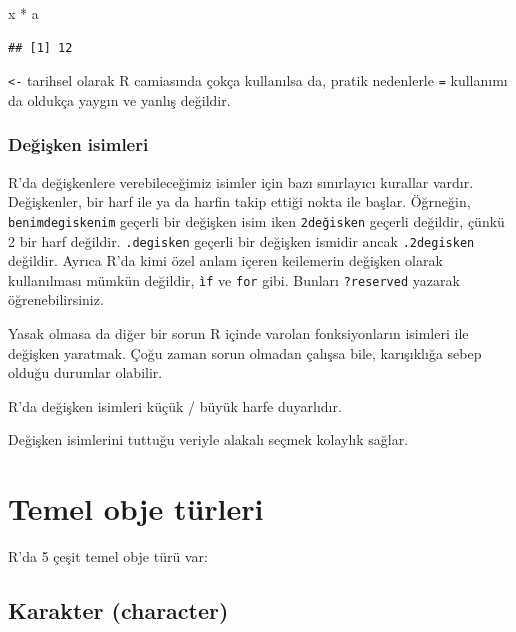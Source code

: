 \documentclass[
]{book}
\newenvironment{Shaded}{\begin{snugshade}}{\end{snugshade}}
\newcommand{\NormalTok}[1]{#1}
\newcommand{\SpecialCharTok}[1]{\textcolor[rgb]{0.00,0.00,0.00}{#1}}
\begin{document}
\begin{Shaded}
\begin{Highlighting}[]
\NormalTok{x }\SpecialCharTok{*}\NormalTok{ a}
\end{Highlighting}
\end{Shaded}

\begin{verbatim}
## [1] 12
\end{verbatim}

\texttt{\textless{}-} tarihsel olarak R camiasında çokça kullanılsa da, pratik nedenlerle \texttt{=} kullanımı da oldukça yaygın ve yanlış değildir.

\hypertarget{deux11fiux15fken-isimleri}{%
\subsection{Değişken isimleri}\label{deux11fiux15fken-isimleri}}

R'da değişkenlere verebileceğimiz isimler için bazı sınırlayıcı kurallar vardır. Değişkenler, bir harf ile ya da harfin takip ettiği nokta ile başlar. Öğrneğin, \texttt{benimdegiskenim} geçerli bir değişken isim iken \texttt{2değisken} geçerli değildir, çünkü 2 bir harf değildir. \texttt{.degisken} geçerli bir değişken ismidir ancak \texttt{.2degisken} değildir. Ayrıca R'da kimi özel anlam içeren keilemerin değişken olarak kullanılması mümkün değildir, \texttt{ìf} ve \texttt{for} gibi. Bunları \texttt{?reserved} yazarak öğrenebilirsiniz.

Yasak olmasa da diğer bir sorun R içinde varolan fonksiyonların isimleri ile değişken yaratmak. Çoğu zaman sorun olmadan çalışsa bile, karışıklığa sebep olduğu durumlar olabilir.

R'da değişken isimleri küçük / büyük harfe duyarlıdır.

Değişken isimlerini tuttuğu veriyle alakalı seçmek kolaylık sağlar.

\hypertarget{temel-obje-tuxfcrleri}{%
\chapter{Temel obje türleri}\label{temel-obje-tuxfcrleri}}

R'da 5 çeşit temel obje türü var:

\hypertarget{karakter-character}{%
\section{Karakter (character)}\label{karakter-character}}
\end{document}
